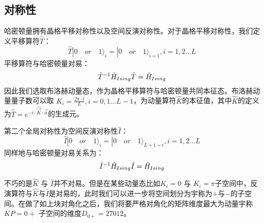 \subsection{对称性}
哈密顿量拥有晶格平移对称性以及空间反演对称性。对于晶格平移对称性，我们定义平移算符$\hat{T}$：
\begin{equation}
	\hat{T} |0 \quad or \quad 1 \rangle_{i} =  |0 \quad or \quad 1 \rangle_{i+1}, i=1,2...L
\end{equation}
平移算符与哈密顿量对易：
\begin{equation}
	\hat{T}^{-1}\hat{H}_{Ising}\hat{T} = \hat{H}_{Ising}\\
\end{equation}
因此我们选取布洛赫动量态，作为晶格平移算符与哈密顿量共同本征态。布洛赫动量量子数可以取 $K_i=\frac{2\pi\cdot i}{L},i=0,1...L-1$，为动量算符$\hat{K}$的本征值，其中$\hat{K}$的定义为$\hat{T} = e^{-i\cdot\hat{\vec{K} }\cdot \vec{a}}$的生成元。

第二个全局对称性为空间反演对称性$\hat{I}$：
\begin{equation}
	\hat{I} |0 \quad or \quad 1 \rangle_{i} =  |0 \quad or \quad 1 \rangle_{L+1-i}, i=1,2...L
\end{equation}
同样地与哈密顿量对易关系为：
\begin{equation}
	\hat{I}^{-1}\hat{H}_{Ising}\hat{I} = \hat{H}_{Ising}\\
\end{equation}

不巧的是$\hat{K}$ 与 $\hat{I}$并不对易。但是在某些动量态比如$K_i=0$ 与 $K_i=\pi$子空间中，反演算符与$\hat{K}$与$\hat{I}$是对易的，此时我们可以进一步将空间划分为宇称为$+$与$-$的子空间。在做了如上块对角化之后，我们将要严格对角化的矩阵维度最大为动量宇称$KP=0+$
子空间的维度$D_{0+}=27012$。


